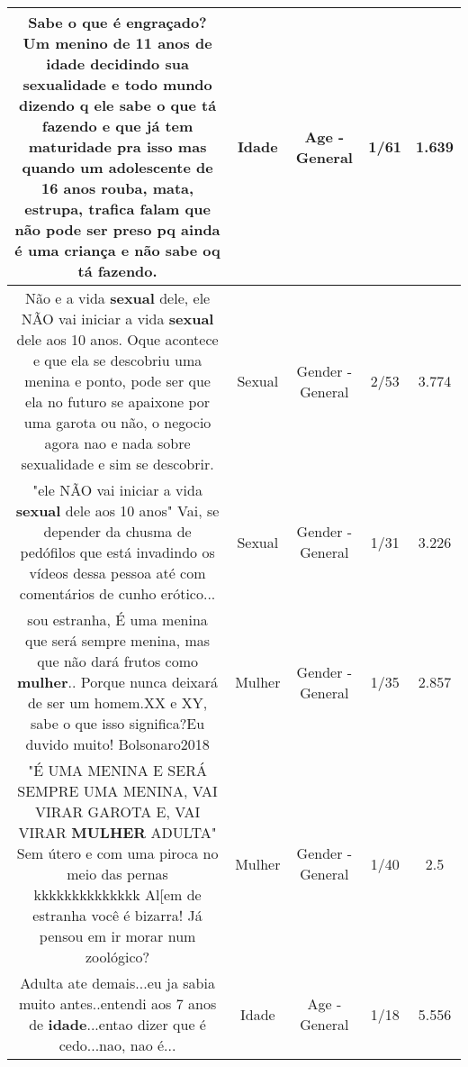 \documentclass[11pt]{article}
\newlength\mylength
\begin{document}
\begin{center}
\begin{longtable}{|C{.65\mylength}|C{.30\mylength}|C{.12\mylength}|C{.12\mylength}|C{.12\mylength}|}
  \small Sabe o que é engraçado? Um menino de 11 anos de \textbf{idade} decidindo sua sexualidade e todo mundo dizendo q ele sabe o que tá fazendo e que já tem maturidade pra isso mas quando um adolescente de 16 anos rouba, mata, estrupa, trafica  falam que não pode ser preso pq ainda é uma criança e não sabe oq tá fazendo.\normalsize   & Idade & Age - General & 1/61 & 1.639 \\  \hline
  \small Não e a vida \textbf{sexual} dele, ele NÃO vai iniciar a vida \textbf{sexual} dele aos 10 anos. Oque acontece e que ela se descobriu uma menina e ponto, pode ser que ela no futuro se apaixone por uma garota ou não, o negocio agora nao e nada sobre sexualidade e sim se descobrir.\normalsize   & Sexual & Gender - General & 2/53 & 3.774 \\  \hline
  \small "ele NÃO vai iniciar a vida \textbf{sexual} dele aos 10 anos" Vai, se depender da chusma de pedófilos que está invadindo os vídeos dessa pessoa até com comentários de cunho erótico...\normalsize   & Sexual & Gender - General & 1/31 & 3.226 \\  \hline
  \small sou estranha, É uma menina que será sempre menina, mas que não dará frutos como \textbf{mulher}.. Porque nunca deixará de ser um homem.XX e XY, sabe o que isso significa?Eu duvido muito! Bolsonaro2018\normalsize   & Mulher & Gender - General & 1/35 & 2.857 \\  \hline
  \small "É UMA MENINA E SERÁ SEMPRE UMA MENINA, VAI VIRAR GAROTA E, VAI VIRAR \textbf{MULHER} ADULTA" Sem útero e com uma piroca no meio das pernas kkkkkkkkkkkkkk Al[em de estranha você é bizarra! Já pensou em ir morar num zoológico?\normalsize   & Mulher & Gender - General & 1/40 & 2.5 \\  \hline
  \small Adulta ate demais...eu ja sabia muito antes..entendi aos 7 anos de \textbf{idade}...entao dizer que é cedo...nao, nao é...\normalsize   & Idade & Age - General & 1/18 & 5.556 \\  \hline

\end{longtable}
\end{center}
\end{document}
